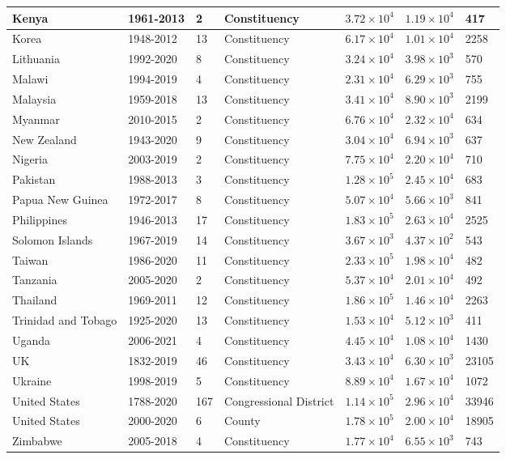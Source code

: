 \begin{table}[h]
\begin{tabular}{|l|l|l|l|l|l|l|}
Kenya & 1961-2013 & 2 & Constituency & $3.72\times 10^{4}$ & $1.19\times 10^{4}$ & 417\\ \hline
Korea & 1948-2012 & 13 & Constituency & $6.17\times 10^{4}$ & $1.01\times 10^{4}$ & 2258\\ \hline
Lithuania & 1992-2020 & 8 & Constituency & $3.24\times 10^{4}$ & $3.98\times 10^{3}$ & 570\\ \hline
Malawi & 1994-2019 & 4 & Constituency & $2.31\times 10^{4}$ & $6.29\times 10^{3}$ & 755\\ \hline
Malaysia & 1959-2018 & 13 & Constituency & $3.41\times 10^{4}$ & $8.90\times 10^{3}$ & 2199\\ \hline
Myanmar & 2010-2015 & 2 & Constituency & $6.76\times 10^{4}$ & $2.32\times 10^{4}$ & 634\\ \hline
New Zealand & 1943-2020 & 9 & Constituency & $3.04\times 10^{4}$ & $6.94\times 10^{3}$ & 637\\ \hline
Nigeria & 2003-2019 & 2 & Constituency & $7.75\times 10^{4}$ & $2.20\times 10^{4}$ & 710\\ \hline
Pakistan & 1988-2013 & 3 & Constituency & $1.28\times 10^{5}$ & $2.45\times 10^{4}$ & 683\\ \hline
Papua New Guinea & 1972-2017 & 8 & Constituency & $5.07\times 10^{4}$ & $5.66\times 10^{3}$ & 841\\ \hline
Philippines & 1946-2013 & 17 & Constituency & $1.83\times 10^{5}$ & $2.63\times 10^{4}$ & 2525\\ \hline
Solomon Islands & 1967-2019 & 14 & Constituency & $3.67\times 10^{3}$ & $4.37\times 10^{2}$ & 543\\ \hline
Taiwan & 1986-2020 & 11 & Constituency & $2.33\times 10^{5}$ & $1.98\times 10^{4}$ & 482\\ \hline
Tanzania & 2005-2020 & 2 & Constituency & $5.37\times 10^{4}$ & $2.01\times 10^{4}$ & 492\\ \hline
Thailand & 1969-2011 & 12 & Constituency & $1.86\times 10^{5}$ & $1.46\times 10^{4}$ & 2263\\ \hline
Trinidad and Tobago & 1925-2020 & 13 & Constituency & $1.53\times 10^{4}$ & $5.12\times 10^{3}$ & 411\\ \hline
Uganda & 2006-2021 & 4 & Constituency & $4.45\times 10^{4}$ & $1.08\times 10^{4}$ & 1430\\ \hline
UK & 1832-2019 & 46 & Constituency & $3.43\times 10^{4}$ & $6.30\times 10^{3}$ & 23105\\ \hline
Ukraine & 1998-2019 & 5 & Constituency & $8.89\times 10^{4}$ & $1.67\times 10^{4}$ & 1072\\ \hline
United States & 1788-2020 & 167 & Congressional District & $1.14\times 10^{5}$ & $2.96\times 10^{4}$ & 33946\\ \hline
United States & 2000-2020 & 6 & County & $1.78\times 10^{5}$ & $2.00\times 10^{4}$ & 18905\\ \hline
Zimbabwe & 2005-2018 & 4 & Constituency & $1.77\times 10^{4}$ & $6.55\times 10^{3}$ & 743\\ \hline
\end{tabular}
\end{table}

